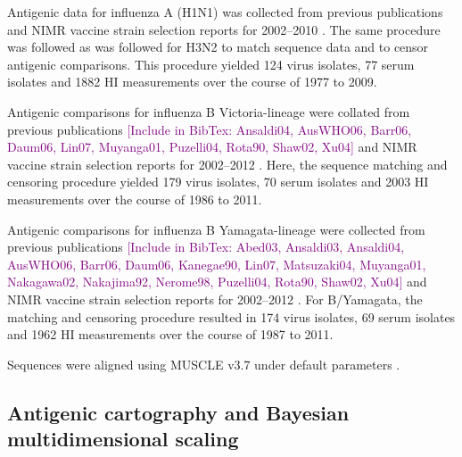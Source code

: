 \documentclass[11pt,oneside,letterpaper]{article}
\def\tbc#1{\textcolor{purple}{[#1]}}
\begin{document}
Antigenic data for influenza A (H1N1) was collected from previous publications \cite{Kendal78,Webster79,Nakajima79,Nakajima81,Chakraverty82,Pereira82,Chakraverty86,Cox83,Daniels85,Raymond86,Stevens87,Donatelli93,Hay01,Daum02,McDonald07,Barr10} and NIMR vaccine strain selection reports for 2002--2010 \cite{NIMR02,NIMR03,NIMR04,NIMRFeb05,NIMRSep05,NIMRMarch06,NIMRSep06,NIMRMarch07,NIMRSep07,NIMRMarch08,NIMRSep08,NIMRFeb09,NIMRFeb10}.
The same procedure was followed as was followed for H3N2 to match sequence data and to censor antigenic comparisons.
This procedure yielded 124 virus isolates, 77 serum isolates and 1882 HI measurements over the course of 1977 to 2009.

Antigenic comparisons for influenza B Victoria-lineage were collated from previous publications \cite{Hay01} \tbc{Include in BibTex: Ansaldi04, AusWHO06, Barr06, Daum06, Lin07, Muyanga01, Puzelli04, Rota90, Shaw02, Xu04} and NIMR vaccine strain selection reports for 2002--2012 \cite{NIMR02,NIMR03,NIMR04,NIMRFeb05,NIMRSep05,NIMRMarch06,NIMRSep06,NIMRMarch07,NIMRSep07,NIMRMarch08,NIMRFeb09,NIMRSep09,NIMRFeb10,NIMRSep10,NIMRFeb11,NIMRSep11,NIMRFeb12}.
Here, the sequence matching and censoring procedure yielded 179 virus isolates, 70 serum isolates and 2003 HI measurements over the course of 1986 to 2011.

Antigenic comparisons for influenza B Yamagata-lineage were collected from previous publications \cite{Hay01} \tbc{Include in BibTex: Abed03, Ansaldi03, Ansaldi04, AusWHO06, Barr06, Daum06, Kanegae90, Lin07, Matsuzaki04, Muyanga01, Nakagawa02, Nakajima92, Nerome98, Puzelli04, Rota90, Shaw02, Xu04} and NIMR vaccine strain selection reports for 2002--2012 \cite{NIMR02,NIMR03,NIMR04,NIMRFeb05,NIMRSep05,NIMRMarch06,NIMRSep06,NIMRMarch07,NIMRSep07,NIMRMarch08,NIMRFeb09,NIMRSep09,NIMRFeb10,NIMRSep10,NIMRFeb11,NIMRSep11,NIMRFeb12}.
For B/Yamagata, the matching and censoring procedure resulted in 174 virus isolates, 69 serum isolates and 1962 HI measurements over the course of 1987 to 2011.

Sequences were aligned using MUSCLE v3.7 under default parameters \cite{MUSCLE}.

\subsection*{Antigenic cartography and Bayesian multidimensional scaling}
\end{document}
